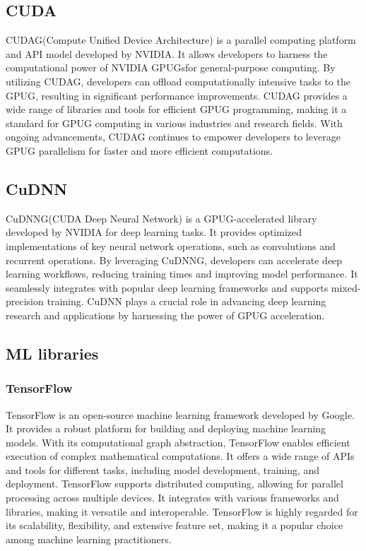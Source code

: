 \subsection{CUDA}\label{subsec:cuda}
\gls{CUDAG}\glsfirstoccur (Compute Unified Device Architecture) is a parallel computing platform and API model developed by NVIDIA. 
It allows developers to harness the computational power of NVIDIA \gls{GPUG}s\glsfirstoccur for general-purpose computing. 
By utilizing \gls{CUDAG}, developers can offload computationally intensive tasks to the \gls{GPUG}, resulting in significant performance improvements. 
\gls{CUDAG} provides a wide range of libraries and tools for efficient \gls{GPUG} programming, making it a standard for \gls{GPUG} computing in various industries and research fields. 
With ongoing advancements, \gls{CUDAG} continues to empower developers to leverage \gls{GPUG} parallelism for faster and more efficient computations.

\subsection{CuDNN}\label{subsec:cudnn}
\gls{CuDNNG}\glsfirstoccur (CUDA Deep Neural Network) is a \gls{GPUG}-accelerated library developed by NVIDIA for deep learning tasks. 
It provides optimized implementations of key neural network operations, such as convolutions and recurrent operations. 
By leveraging \gls{CuDNNG}, developers can accelerate deep learning workflows, reducing training times and improving model performance. 
It seamlessly integrates with popular deep learning frameworks and supports mixed-precision training. 
CuDNN plays a crucial role in advancing deep learning research and applications by harnessing the power of \gls{GPUG} acceleration.

\subsection{ML libraries}\label{subsec:mllib}
\subsubsection*{TensorFlow}\label{subsubsec:tensorflow}
TensorFlow is an open-source machine learning framework developed by Google. It provides a robust platform for building and deploying machine learning models. 
With its computational graph abstraction, TensorFlow enables efficient execution of complex mathematical computations. 
It offers a wide range of APIs and tools for different tasks, including model development, training, and deployment. 
TensorFlow supports distributed computing, allowing for parallel processing across multiple devices. It integrates with various frameworks and libraries, making it versatile and interoperable. 
TensorFlow is highly regarded for its scalability, flexibility, and extensive feature set, making it a popular choice among machine learning practitioners.
